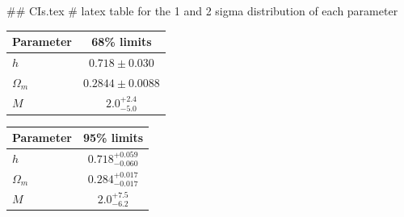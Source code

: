 ## CIs.tex
# latex table for the 1 and 2 sigma distribution of each parameter

\begin{tabular} { l  c}
 Parameter &  68\% limits\\
\hline
{\boldmath$h              $} & $0.718\pm 0.030            $\\
{\boldmath$\Omega_m       $} & $0.2844\pm 0.0088          $\\
{\boldmath$M              $} & $2.0^{+2.4}_{-5.0}         $\\
\hline
\end{tabular}

\begin{tabular} { l  c}
 Parameter &  95\% limits\\
\hline
{\boldmath$h              $} & $0.718^{+0.059}_{-0.060}   $\\
{\boldmath$\Omega_m       $} & $0.284^{+0.017}_{-0.017}   $\\
{\boldmath$M              $} & $2.0^{+7.5}_{-6.2}         $\\
\hline
\end{tabular}

